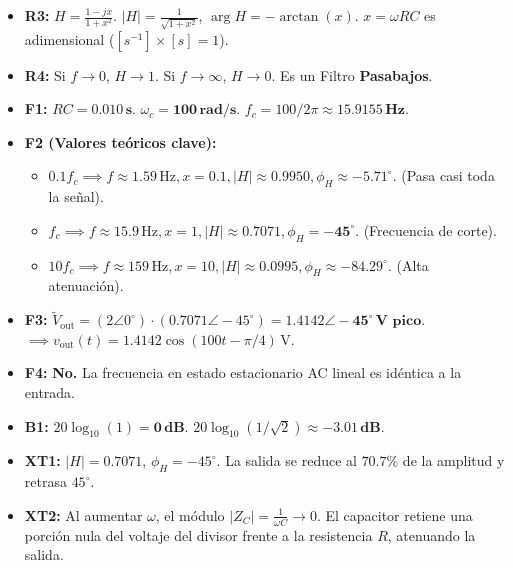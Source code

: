 \documentclass[11pt, a4paper]{article}
\begin{document}
\begin{itemize}
    \item \textbf{R3:} $H = \frac{1-jx}{1+x^2}$. $|H| = \frac{1}{\sqrt{1+x^2}}$, $\arg H = -\arctan(x)$. $x = \omega RC$ es adimensional ($[s^{-1}] \times [s] = 1$).
    \item \textbf{R4:} Si $f \to 0$, $H \to 1$. Si $f \to \infty$, $H \to 0$. Es un Filtro \textbf{Pasabajos}.
    \item \textbf{F1:} $RC = \mathbf{0.010\,\text{s}}$. $\omega_c = \mathbf{100\,\text{rad/s}}$. $f_c = 100/2\pi \approx \mathbf{15.9155\,\text{Hz}}$.
    \item \textbf{F2 (Valores teóricos clave):} 
    \begin{itemize}
        \item $0.1f_c \implies f \approx 1.59\,\text{Hz}, x=0.1, |H| \approx \mathbf{0.9950}, \phi_H \approx \mathbf{-5.71^\circ}$. (Pasa casi toda la señal).
        \item $f_c \implies f \approx 15.9\,\text{Hz}, x=1, |H| \approx \mathbf{0.7071}, \phi_H = \mathbf{-45^\circ}$. (Frecuencia de corte).
        \item $10f_c \implies f \approx 159\,\text{Hz}, x=10, |H| \approx \mathbf{0.0995}, \phi_H \approx \mathbf{-84.29^\circ}$. (Alta atenuación).
    \end{itemize}
    \item \textbf{F3:} $\tilde{V}_{\text{out}} = (2\angle 0^\circ) \cdot (0.7071\angle -45^\circ) = \mathbf{1.4142\angle -45^\circ\,\text{V pico}}$. $\implies v_{\text{out}}(t) = 1.4142\cos(100t - \pi/4)\,\text{V}$.
    \item \textbf{F4:} \textbf{No.} La frecuencia en estado estacionario AC lineal es idéntica a la entrada.
    \item \textbf{B1:} $20\log_{10}(1) = \mathbf{0\,\text{dB}}$. $20\log_{10}(1/\sqrt{2}) \approx \mathbf{-3.01\,\text{dB}}$.
    \item \textbf{XT1:} $|H| = 0.7071$, $\phi_H = -45^\circ$. La salida se reduce al $70.7\%$ de la amplitud y retrasa $45^\circ$.
    \item \textbf{XT2:} Al aumentar $\omega$, el módulo $|Z_C| = \frac{1}{\omega C} \to 0$. El capacitor retiene una porción nula del voltaje del divisor frente a la resistencia $R$, atenuando la salida.
\end{itemize}
\end{document}
